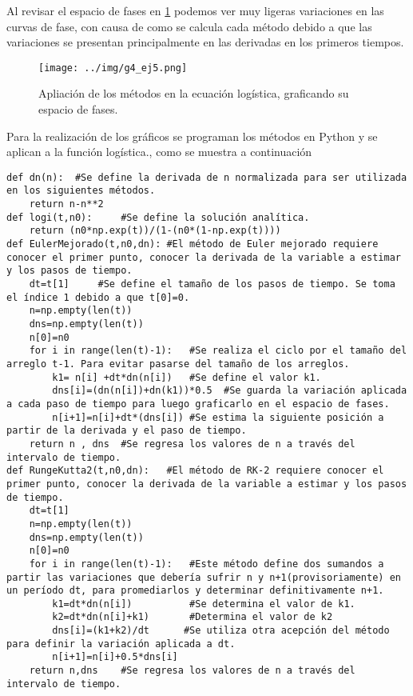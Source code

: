 \documentclass[../portafolio.tex]{subfiles}
\begin{document}
Al revisar el espacio de fases en \ref{g4_ej5:graf_ej5_0fases} podemos ver muy ligeras variaciones en las curvas de fase, con causa de como se calcula cada método debido a que las variaciones se presentan principalmente en las derivadas en los primeros tiempos.
\begin{figure}
\centering
\texttt{[image: ../img/g4\_ej5.png]}
\caption{Apliación de los métodos en la ecuación logística, graficando su espacio de fases.}\label{g4_ej5:graf_ej5_0fases}
\end{figure}

Para la realización de los gráficos se programan los métodos en Python y se aplican a la función logística., como se muestra a continuación
\begin{verbatim}
def dn(n):  #Se define la derivada de n normalizada para ser utilizada en los siguientes métodos.
    return n-n**2
def logi(t,n0):     #Se define la solución analítica.
    return (n0*np.exp(t))/(1-(n0*(1-np.exp(t))))
def EulerMejorado(t,n0,dn): #El método de Euler mejorado requiere conocer el primer punto, conocer la derivada de la variable a estimar y los pasos de tiempo.
    dt=t[1]     #Se define el tamaño de los pasos de tiempo. Se toma el índice 1 debido a que t[0]=0.
    n=np.empty(len(t))  
    dns=np.empty(len(t))
    n[0]=n0  
    for i in range(len(t)-1):   #Se realiza el ciclo por el tamaño del arreglo t-1. Para evitar pasarse del tamaño de los arreglos.  
        k1= n[i] +dt*dn(n[i])   #Se define el valor k1.
        dns[i]=(dn(n[i])+dn(k1))*0.5  #Se guarda la variación aplicada a cada paso de tiempo para luego graficarlo en el espacio de fases.
        n[i+1]=n[i]+dt*(dns[i]) #Se estima la siguiente posición a partir de la derivada y el paso de tiempo.
    return n , dns  #Se regresa los valores de n a través del intervalo de tiempo.
def RungeKutta2(t,n0,dn):   #El método de RK-2 requiere conocer el primer punto, conocer la derivada de la variable a estimar y los pasos de tiempo.
    dt=t[1] 
    n=np.empty(len(t))
    dns=np.empty(len(t))
    n[0]=n0
    for i in range(len(t)-1):   #Este método define dos sumandos a partir las variaciones que debería sufrir n y n+1(provisoriamente) en un período dt, para promediarlos y determinar definitivamente n+1.
        k1=dt*dn(n[i])          #Se determina el valor de k1.
        k2=dt*dn(n[i]+k1)       #Determina el valor de k2
        dns[i]=(k1+k2)/dt      #Se utiliza otra acepción del método para definir la variación aplicada a dt.
        n[i+1]=n[i]+0.5*dns[i]
    return n,dns    #Se regresa los valores de n a través del intervalo de tiempo.


\end{verbatim}
\end{document}
